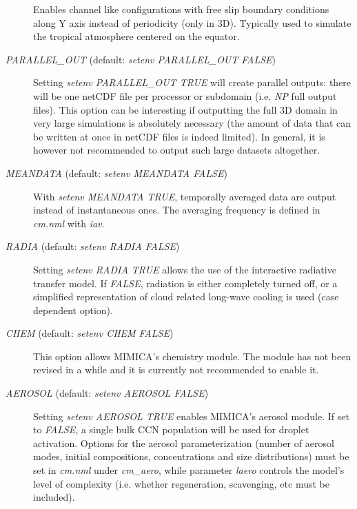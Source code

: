 \documentclass[12pt,A4,french]{article}
\begin{document}
\begin{description}
Enables channel like configurations with free slip boundary conditions along Y axis instead of periodicity (only in 3D). Typically used to simulate the tropical atmosphere centered on the equator.

\item[{\it PARALLEL\_OUT} (default: {\it setenv PARALLEL\_OUT FALSE})]

Setting {\it setenv PARALLEL\_OUT TRUE} will create parallel outputs: there will be one netCDF file per processor or subdomain (i.e. {\it NP} full output files). This option can be interesting if outputting the full 3D domain in very large simulations is absolutely necessary (the amount of data that can be written at once in netCDF files is indeed limited). In general, it is however not recommended to output such large datasets altogether.

\item[{\it MEANDATA} (default: {\it setenv MEANDATA FALSE})]

With {\it setenv MEANDATA TRUE}, temporally averaged data are output instead of instantaneous ones. The averaging frequency is defined in {\it cm.nml} with {\it iav}.

\item[{\it RADIA} (default: {\it setenv RADIA FALSE})]

Setting {\it setenv RADIA TRUE} allows the use of the interactive radiative transfer model. If {\it FALSE}, radiation is either completely turned off, or a simplified representation of cloud related long-wave cooling is used (case dependent option).

\item[{\it CHEM} (default: {\it setenv CHEM FALSE})]

This option allows MIMICA's chemistry module. The module has not been revised in a while and it is currently not recommended to enable it.

\item[{\it AEROSOL} (default: {\it setenv AEROSOL FALSE})]

Setting {\it setenv AEROSOL TRUE} enables MIMICA's aerosol module. If set to {\it FALSE}, a single bulk CCN population will be used for droplet activation. Options for the aerosol parameterization (number of aerosol modes, initial compositions, concentrations and size distributions) must be set in {\it cm.nml} under {\it cm\_aero}, while parameter {\it laero} controls the model's level of complexity (i.e. whether regeneration, scavenging, etc must be included).


\end{description}
\end{document}
